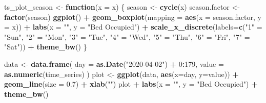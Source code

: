 \documentclass[
]{article}
\newenvironment{Shaded}{\begin{snugshade}}{\end{snugshade}}
\newcommand{\ControlFlowTok}[1]{\textcolor[rgb]{0.13,0.29,0.53}{\textbf{#1}}}
\newcommand{\DataTypeTok}[1]{\textcolor[rgb]{0.13,0.29,0.53}{#1}}
\newcommand{\DecValTok}[1]{\textcolor[rgb]{0.00,0.00,0.81}{#1}}
\newcommand{\FloatTok}[1]{\textcolor[rgb]{0.00,0.00,0.81}{#1}}
\newcommand{\KeywordTok}[1]{\textcolor[rgb]{0.13,0.29,0.53}{\textbf{#1}}}
\newcommand{\NormalTok}[1]{#1}
\newcommand{\OperatorTok}[1]{\textcolor[rgb]{0.81,0.36,0.00}{\textbf{#1}}}
\newcommand{\StringTok}[1]{\textcolor[rgb]{0.31,0.60,0.02}{#1}}
\begin{document}
\begin{Shaded}
\begin{Highlighting}[]
\NormalTok{ts_plot_season <-}\StringTok{ }\ControlFlowTok{function}\NormalTok{(}\DataTypeTok{x =}\NormalTok{ x) \{}
\NormalTok{season <-}\StringTok{ }\KeywordTok{cycle}\NormalTok{(x)}
\NormalTok{season.factor <-}\StringTok{ }\KeywordTok{factor}\NormalTok{(season)}
\KeywordTok{ggplot}\NormalTok{() }\OperatorTok{+}\StringTok{ }
\StringTok{  }\KeywordTok{geom_boxplot}\NormalTok{(}\DataTypeTok{mapping =} \KeywordTok{aes}\NormalTok{(}\DataTypeTok{x =}\NormalTok{ season.factor,}
                             \DataTypeTok{y =}\NormalTok{ x)) }\OperatorTok{+}
\StringTok{  }\KeywordTok{labs}\NormalTok{(}\DataTypeTok{x =} \StringTok{""}\NormalTok{, }\DataTypeTok{y =}  \StringTok{"Bed Occupied"}\NormalTok{) }\OperatorTok{+}
\StringTok{  }\KeywordTok{scale_x_discrete}\NormalTok{(}\DataTypeTok{labels=}\KeywordTok{c}\NormalTok{(}\StringTok{"1"}\NormalTok{ =}\StringTok{ "Sun"}\NormalTok{, }\StringTok{"2"}\NormalTok{ =}\StringTok{ "Mon"}\NormalTok{, }\StringTok{"3"}\NormalTok{ =}\StringTok{ "Tue"}\NormalTok{, }\StringTok{"4"}\NormalTok{ =}\StringTok{ "Wed"}\NormalTok{, }\StringTok{"5"}\NormalTok{ =}\StringTok{ "Thu"}\NormalTok{, }\StringTok{"6"}\NormalTok{ =}\StringTok{ "Fri"}\NormalTok{, }\StringTok{"7"}\NormalTok{ =}\StringTok{ "Sat"}\NormalTok{)) }\OperatorTok{+}
\StringTok{  }\KeywordTok{theme_bw}\NormalTok{()}
\NormalTok{\}}

\NormalTok{data <-}\StringTok{ }\KeywordTok{data.frame}\NormalTok{(}
  \DataTypeTok{day =} \KeywordTok{as.Date}\NormalTok{(}\StringTok{"2020-04-02"}\NormalTok{) }\OperatorTok{+}\StringTok{ }\DecValTok{0}\OperatorTok{:}\DecValTok{179}\NormalTok{,}
  \DataTypeTok{value =} \KeywordTok{as.numeric}\NormalTok{(time_series)}
\NormalTok{)}
\NormalTok{plot <-}\StringTok{ }\KeywordTok{ggplot}\NormalTok{(data, }\KeywordTok{aes}\NormalTok{(}\DataTypeTok{x=}\NormalTok{day, }\DataTypeTok{y=}\NormalTok{value)) }\OperatorTok{+}
\StringTok{  }\KeywordTok{geom_line}\NormalTok{(}\DataTypeTok{size =} \FloatTok{0.7}\NormalTok{) }\OperatorTok{+}\StringTok{ }
\StringTok{  }\KeywordTok{xlab}\NormalTok{(}\StringTok{""}\NormalTok{)}
\NormalTok{plot }\OperatorTok{+}\StringTok{ }\KeywordTok{labs}\NormalTok{(}\DataTypeTok{x =} \StringTok{""}\NormalTok{, }\DataTypeTok{y =}  \StringTok{"Bed Occupied"}\NormalTok{) }\OperatorTok{+}\StringTok{ }\KeywordTok{theme_bw}\NormalTok{()}
\end{Highlighting}
\end{Shaded}
\end{document}
